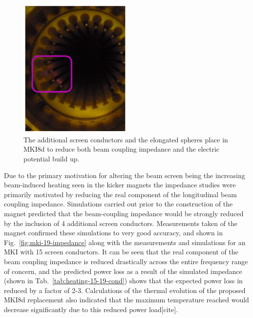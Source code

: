 \begin{figure}
\begin{center}
\includegraphics[width=0.5\textwidth]{LHC_MKI/figures/mki8d-balls.png}
\end{center}
\label{fig:mki8d-points}
\caption{The additional screen conductors and the elongated spheres place in MKI8d to reduce both beam coupling impedance and the electric potential build up.}
\end{figure}

Due to the primary motivation for altering the beam screen being the increasing beam-induced heating seen in the kicker magnets the impedance studies were primarily motivated by reducing the real component of the longitudinal beam coupling impedance. Simulations carried out prior to the construction of the magnet predicted that the beam-coupling impedance would be strongly reduced by the inclusion of 4 additional screen conductors. Measurements taken of the magnet  confirmed these simulations to very good accuracy, and shown in Fig.~\ref{fig:mki-19-impedance} along with the measurements and simulations for an MKI with 15 screen conductors. It can be seen that the real component of the beam coupling impedance is reduced drastically across the entire frequency range of concern, and the predicted power loss as a result of the simulated impedance (shown in Tab.~\ref{tab:heating-15-19-cond}) shows that the expected power loss in reduced by a factor of 2-3. Calculations of the thermal evolution of the proposed MKI8d replacement also indicated that the maximum temperature reached would decrease significantly due to this reduced power load[cite]. 


